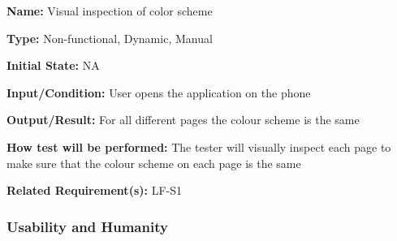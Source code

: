 \documentclass[12pt, titlepage]{article}
\begin{document}
\begin{enumerate}
\textbf{Name:} Visual inspection of color scheme

\textbf{Type:} Non-functional, Dynamic, Manual
					
\textbf{Initial State:} NA
					
\textbf{Input/Condition:} User opens the application on the phone
					
\textbf{Output/Result:} For all different pages the colour scheme is the same

\textbf{How test will be performed:} The tester will visually inspect each page to make sure that the colour scheme on each page is the same

\textbf{Related Requirement(s):} LF-S1
\end{enumerate}

\subsubsection{Usability and Humanity}
\end{document}
